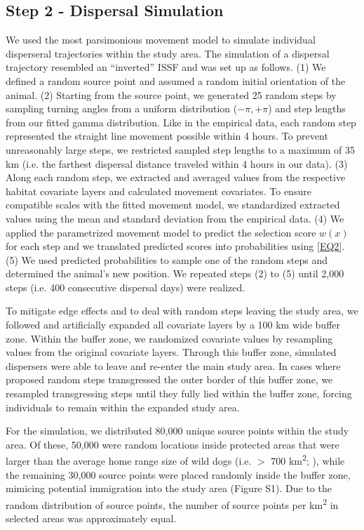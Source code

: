 \documentclass[abstract=on,10pt,a4paper,bibliography=totocnumbered]{article}
\begin{document}
\subsection{Step 2 - Dispersal Simulation}
We used the most parsimonious movement model to simulate individual disperseral
trajectories within the study area. The simulation of a dispersal trajectory
resembled an ``inverted''  ISSF and was set up as follows. (1) We defined a
random source point and assumed a random initial orientation of the animal. (2)
Starting from the source point, we generated 25 random steps by sampling turning
angles from a uniform distribution (\(-\pi, +\pi\)) and step lengths from our
fitted gamma distribution. Like in the empirical data, each random step
represented the straight line movement possible within 4 hours. To prevent
unreasonably large steps, we restricted sampled step lengths to a maximum of 35
km (i.e. the farthest dispersal distance traveled within 4 hours in our data).
(3) Along each random step, we extracted and averaged values from the respective
habitat covariate layers and calculated movement covariates. To ensure
compatible scales with the fitted movement model, we standardized extracted
values using the mean and standard deviation from the empirical data. (4) We
applied the parametrized movement model to predict the selection score \(w(x)\)
for each step and we translated predicted scores into probabilities using
\ref{EQ2}. (5) We used predicted probabilities to sample one of the random steps
and determined the animal's new position. We repeated steps (2) to (5) until
2,000 steps (i.e. 400 consecutive dispersal days) were realized.

To mitigate edge effects and to deal with random steps leaving the study area,
we followed \cite{Koen.2010} and artificially expanded all covariate layers by
a 100 km wide buffer zone. Within the buffer zone, we randomized covariate
values by resampling values from the original covariate layers. Through this
buffer zone, simulated dispersers were able to leave and re-enter the main study
area. In cases where proposed random steps transgressed the outer border of this
buffer zone, we resampled transgressing steps until they fully lied within the
buffer zone, forcing individuals to remain within the expanded study area.

For the simulation, we distributed 80,000 unique source points within the study
area. Of these, 50,000 were random locations inside protected areas that were
larger than the average home range size of wild dogs (i.e. \(>\) 700
km\textsuperscript{2}; \citealp{Pomilia.2015}), while the remaining 30,000
source points were placed randomly inside the buffer zone, mimicing potential
immigration into the study area (Figure S1). Due to the random distribution of
source points, the number of source points per km\textsuperscript{2} in selected
areas was approximately equal.
\end{document}
